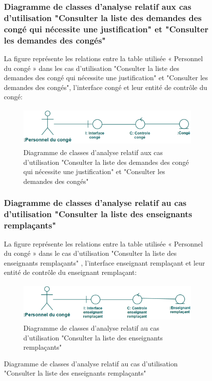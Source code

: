 \documentclass[12 pt]{report}
\begin{document}
\begin{figure}[h]
\begin{center}
\subsubsection{Diagramme de classes d’analyse relatif aux cas d’utilisation "Consulter la liste des demandes des congé qui nécessite une justification" et "Consulter les demandes des congés" }
La figure  représente les relations entre la table utilisée « Personnel du congé » dans les cas d’utilisation  "Consulter la liste des demandes des congé qui nécessite une justification" et "Consulter les demandes des congés", l’interface  congé et  leur entité de  contrôle du congé:
\begin{figure}[h]
\begin{center}
\includegraphics[width= 12cm , height =2cm]{cla_con.png}
\caption{Diagramme de classes d’analyse relatif aux cas d’utilisation "Consulter la liste des demandes des congé qui nécessite une justification" et "Consulter les demandes des congés"}
\end{center}
\end{figure}
\subsubsection{Diagramme de classes d’analyse relatif au cas d’utilisation "Consulter la liste des enseignants remplaçants" }
La figure  représente les relations entre la table utilisée « Personnel du congé » dans le cas d’utilisation  "Consulter la liste des enseignants remplaçants" , l’interface  enseignant remplaçant et  leur entité de  contrôle du enseignant remplaçant:
\begin{figure}[h]
\begin{center}
\includegraphics[width= 12cm , height =2cm]{cla_rem.png}
\caption{Diagramme de classes d’analyse relatif au cas d’utilisation "Consulter la liste des enseignants remplaçants"}
\end{center}
\end{figure}

\end{center}
\end{figure}
\end{document}
